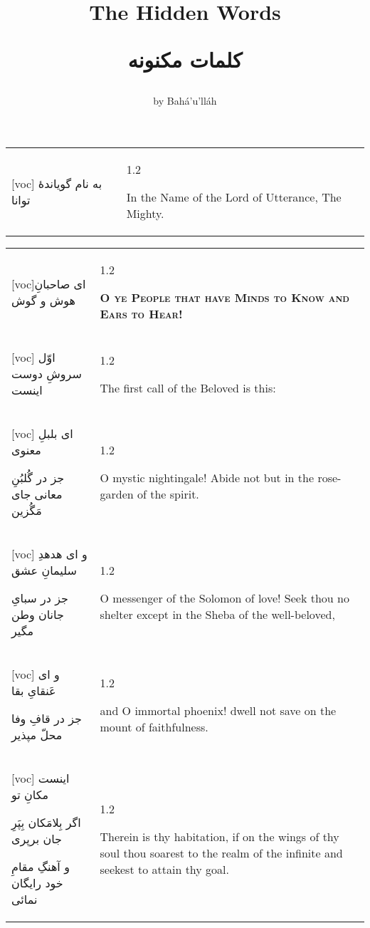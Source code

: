 \documentclass[11pt]{article}
\title{
\Huge
\vspace*{2in}
The Hidden Words \\
\vspace{.25in}
\fontsize{48}{36}
\begin{arab}
کلمات مکنونه
\end{arab}
\vspace{1in}}
\author{\LARGE by Bahá’u’lláh}
\date{}
\makeatletter
\newenvironment{orig}
  {\begin{farsi}[voc]}
  {\end{farsi}}
\newenvironment{trans}
  {\Large\begin{spacing}{1.2}\raggedright}
  {\end{spacing}}
\newenvironment{word}
  {\begin{tabular}[t]{p{2.75in}@{\hspace{3em}}p{2.75in}}}
  {\end{tabular}}
\newcommand{\ayat}[2]{\begin{orig}#1\end{orig} & \begin{trans}#2\end{trans}}
\newcommand{\heading}[2]{\textsc{\textbf{#1}} %
}
\makeatother
\begin{document}
\maketitle
\thispagestyle{empty}

\newpage

\fontsize{24}{32}

\vspace*{3in}

\begin{word}
\ayat{
به نام گویاندۀ توانا
}{
In the Name of the Lord of Utterance, The Mighty.
}
\end{word}

\pagebreak

\begin{word}
\ayat{ای صاحبانِ هوش و گوش}{\heading{
  O ye People that have Minds to Know and Ears to Hear!}{}} \\ \ayat{
اوّل سروشِ دوست اینست
}{The first call of the Beloved is this:} \vspace{-1ex}\\ \ayat{
ای بلبلِ معنوی

جز در گُلبُنِ معانی جای مَگُزين
}{O mystic nightingale! Abide not but in the rose-garden of the spirit.} \\ \ayat{
و ای هدهدِ سلیمانِ عشق

جز در سبایِ جانان وطن مگیر
}{O messenger of the Solomon of love! Seek thou no shelter except in the Sheba
  of the well-beloved,} \vspace{-1ex}\\ \ayat{
و ای عَنقایِ بقا

جز در قافِ وفا محلّ مپذیر
}{and O immortal phoenix! dwell not save on the mount of faithfulness.} \\ \ayat{
اینست مکانِ تو

اگر بِلامَکان بِپَرِ جان برپری

و آهنگِ مقامِ خود رایگان نمائی
}{Therein is thy habitation, if on the wings of thy soul thou soarest to the
  realm of the infinite and seekest to attain thy goal.}
\end{word}

\newpage
\end{document}
